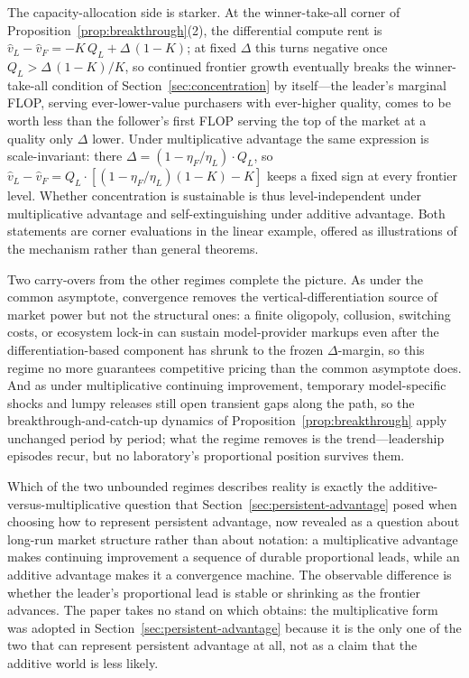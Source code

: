\documentclass[11pt]{article}
\begin{document}
The capacity-allocation side is starker. At the winner-take-all corner of Proposition~\ref{prop:breakthrough}(2), the differential compute rent is $\widehat v_L-\widehat v_F=-K\,Q_L+\Delta\,(1-K)$; at fixed $\Delta$ this turns negative once $Q_L>\Delta\,(1-K)/K$, so continued frontier growth eventually breaks the winner-take-all condition of Section~\ref{sec:concentration} by itself---the leader's marginal FLOP, serving ever-lower-value purchasers with ever-higher quality, comes to be worth less than the follower's first FLOP serving the top of the market at a quality only $\Delta$ lower. Under multiplicative advantage the same expression is scale-invariant: there $\Delta=(1-\eta_F/\eta_L)\cdot Q_L$, so $\widehat v_L-\widehat v_F=Q_L\cdot\left[(1-\eta_F/\eta_L)(1-K)-K\right]$ keeps a fixed sign at every frontier level. Whether concentration is sustainable is thus level-independent under multiplicative advantage and self-extinguishing under additive advantage. Both statements are corner evaluations in the linear example, offered as illustrations of the mechanism rather than general theorems.

Two carry-overs from the other regimes complete the picture. As under the common asymptote, convergence removes the vertical-differentiation source of market power but not the structural ones: a finite oligopoly, collusion, switching costs, or ecosystem lock-in \citep{klemperer1995} can sustain model-provider markups even after the differentiation-based component has shrunk to the frozen $\Delta$-margin, so this regime no more guarantees competitive pricing than the common asymptote does. And as under multiplicative continuing improvement, temporary model-specific shocks and lumpy releases still open transient gaps along the path, so the breakthrough-and-catch-up dynamics of Proposition~\ref{prop:breakthrough} apply unchanged period by period; what the regime removes is the trend---leadership episodes recur, but no laboratory's proportional position survives them.

Which of the two unbounded regimes describes reality is exactly the additive-versus-multiplicative question that Section~\ref{sec:persistent-advantage} posed when choosing how to represent persistent advantage, now revealed as a question about long-run market structure rather than about notation: a multiplicative advantage makes continuing improvement a sequence of durable proportional leads, while an additive advantage makes it a convergence machine. The observable difference is whether the leader's proportional lead is stable or shrinking as the frontier advances. The paper takes no stand on which obtains: the multiplicative form was adopted in Section~\ref{sec:persistent-advantage} because it is the only one of the two that can represent persistent advantage at all, not as a claim that the additive world is less likely.
\end{document}
